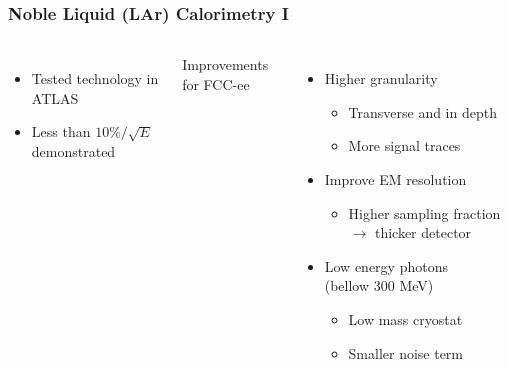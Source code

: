 \documentclass{beamer}
\newcommand{\bluetext}[1]{%
  \textcolor{myBlue}{#1}
}
\begin{document}
\begin{frame}
  \frametitle{Noble Liquid (LAr) Calorimetry I}

  \begin{columns}[c]
    \begin{itemize}
      \item Tested technology in ATLAS
      \item Less than $10\%/\sqrt{E}$ demonstrated
    \end{itemize}

    \bluetext{Improvements for FCC-ee}
    \begin{itemize}
      \item Higher granularity
            \begin{itemize}
              \item Transverse and in depth
              \item More signal traces
            \end{itemize}
      \item Improve EM resolution
            \begin{itemize}
              \item Higher sampling fraction $\rightarrow$ thicker detector
            \end{itemize}
      \item Low energy photons \\
            (bellow 300 MeV)
            \begin{itemize}
              \item Low mass cryostat
              \item Smaller noise term
            \end{itemize}
    \end{itemize}


\end{columns}
\end{frame}
\end{document}
